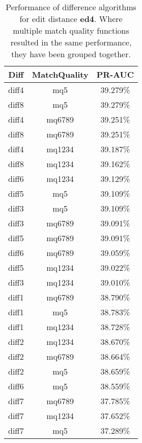\begin{table}[tbph]
\begin{center}
\begin{tabular}{|c|c||c|}
\hline
Diff & MatchQuality & PR-AUC  \\
\hline
\hline
diff4 & mq5 & 39.279\% \\
diff8 & mq5 & 39.279\% \\
diff4 & mq6789 & 39.251\% \\
diff8 & mq6789 & 39.251\% \\
diff4 & mq1234 & 39.187\% \\
diff8 & mq1234 & 39.162\% \\
diff6 & mq1234 & 39.129\% \\
diff5 & mq5 & 39.109\% \\
diff3 & mq5 & 39.109\% \\
diff3 & mq6789 & 39.091\% \\
diff5 & mq6789 & 39.091\% \\
diff6 & mq6789 & 39.059\% \\
diff5 & mq1234 & 39.022\% \\
diff3 & mq1234 & 39.010\% \\
diff1 & mq6789 & 38.790\% \\
diff1 & mq5 & 38.783\% \\
diff1 & mq1234 & 38.728\% \\
diff2 & mq1234 & 38.670\% \\
diff2 & mq6789 & 38.664\% \\
diff2 & mq5 & 38.659\% \\
diff6 & mq5 & 38.559\% \\
diff7 & mq6789 & 37.785\% \\
diff7 & mq1234 & 37.652\% \\
diff7 & mq5 & 37.289\% \\
\hline
\end{tabular}
\end{center}
\caption{Performance of difference algorithms for
  edit distance \textbf{ed4}.  Where multiple match
  quality functions resulted in the same performance, they
  have been grouped together.}
\label{tab:editlongbyed4}
\end{table}
